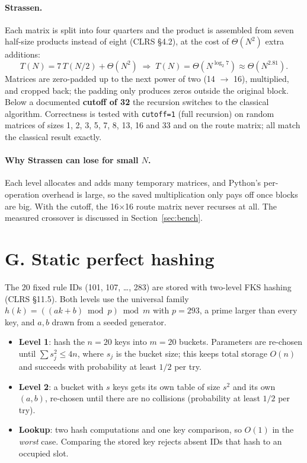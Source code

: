 \documentclass[11pt]{article}
\begin{document}
\paragraph{Strassen.}
Each matrix is split into four quarters and the product is assembled from
seven half-size products instead of eight (CLRS \S4.2), at the cost of
$\Theta(N^2)$ extra additions:
\[
T(N) = 7\,T(N/2) + \Theta(N^2) \;\Rightarrow\; T(N) = \Theta(N^{\log_2 7}) \approx \Theta(N^{2.81}).
\]
Matrices are zero-padded up to the next power of two (14 $\to$ 16), multiplied,
and cropped back; the padding only produces zeros outside the original
block. Below a documented \textbf{cutoff of 32} the recursion switches to the
classical algorithm. Correctness is tested with \texttt{cutoff=1} (full
recursion) on random matrices of sizes 1, 2, 3, 5, 7, 8, 13, 16 and 33 and on
the route matrix; all match the classical result exactly.

\paragraph{Why Strassen can lose for small $N$.}
Each level allocates and adds many temporary matrices, and Python's
per-operation overhead is large, so the saved multiplication only pays off
once blocks are big. With the cutoff, the 16$\times$16 route matrix never
recurses at all. The measured crossover is discussed in
Section~\ref{sec:bench}.

\section{G. Static perfect hashing}

The 20 fixed rule IDs
(101, 107, \ldots, 283) are stored with two-level FKS hashing (CLRS \S11.5).
Both levels use the universal family $h(k) = ((ak+b) \bmod p) \bmod m$ with
$p = 293$, a prime larger than every key, and $a, b$ drawn from a seeded
generator.

\begin{itemize}
  \item \textbf{Level 1}: hash the $n = 20$ keys into $m = 20$ buckets.
  Parameters are re-chosen until $\sum s_j^2 \le 4n$, where $s_j$ is the bucket
  size; this keeps total storage $O(n)$ and succeeds with probability at least
  $1/2$ per try.
  \item \textbf{Level 2}: a bucket with $s$ keys gets its own table of size
  $s^2$ and its own $(a,b)$, re-chosen until there are no collisions
  (probability at least $1/2$ per try).
  \item \textbf{Lookup}: two hash computations and one key comparison, so
  $O(1)$ in the \emph{worst} case. Comparing the stored key rejects absent IDs
  that hash to an occupied slot.
\end{itemize}
\end{document}
